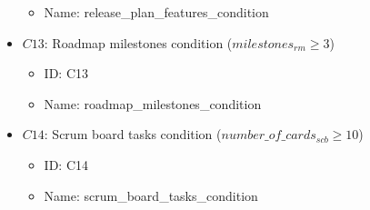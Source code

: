 \documentclass{article}
\begin{document}
\begin{itemize}
\begin{itemize}
            \item Name: release\_plan\_features\_condition
        \end{itemize}
    \item $C13$: Roadmap milestones condition ($milestones_{rm} \geq 3$)
        \begin{itemize}
            \item ID: C13
            \item Name: roadmap\_milestones\_condition
        \end{itemize}
    \item $C14$: Scrum board tasks condition ($number\_of\_cards_{scb} \geq 10$)
        \begin{itemize}
            \item ID: C14
            \item Name: scrum\_board\_tasks\_condition
        \end{itemize}
\end{itemize}
\end{document}
